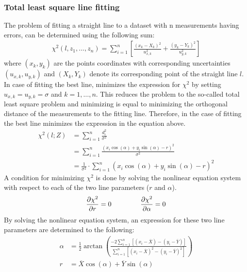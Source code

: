 \documentclass[../Head/Main.tex]{subfiles}
\begin{document}
\subsubsection{Total least square line fitting}
The problem of fitting a straight line to a dataset with n measurements having errors, can be determined using the following sum:
\begin{align}
    \chi^2\left(l, z_1, ..., z_n\right) = \sum_{i = 1}^{n} \left[\frac{\left(x_k - X_k\right)^2}{u_{x, k}^{2}} + \frac{\left(y_k - Y_k\right)^2}{u_{y, k}^{2}}\right]
\end{align}
where $\left(x_k,y_k\right)$ are the points coordinates with corresponding uncertainties $\left(u_{x, k},u_{y, k}\right)$ and $(X_k,Y_k)$ denote its corresponding point of the straight line $l$. In case of fitting the best line, minimizes the expression for $\chi^2$ by setting $u_{x, k} = u_{y, k} = \sigma$ and $k = 1, …, n$. This reduces the problem to the so-called total least square problem and minimizing is equal to minimizing the orthogonal distance of the measurements to the fitting line. Therefore, in the case of fitting the best line minimizes the expression in the equation above.
\begin{align}
    \chi^2\left(l; Z\right) &= \sum_{i = 1}^{n} \frac{d_i^2}{\sigma^2} \\
    &= \sum_{i = 1}^{n}\frac{\left(x_i\cos(\alpha) + y_i\sin⁡(\alpha)-r\right)^2}{\sigma^2}\\
    &= \frac{1}{\sigma^2}\cdot\sum_{i = 1}^{n}\left(x_i\cos(\alpha) + y_i\sin⁡(\alpha)-r\right)^2
\end{align}
A condition for minimizing $\chi^2$ is done by solving the nonlinear equation system with respect to each of the two line parameters ($r$ and $\alpha$). 
\begin{align}
    \frac{\partial\chi^2}{\partial r} = 0 \hspace{1.5cm} \frac{\partial\chi^2}{\partial\alpha} = 0
\end{align}
By solving the nonlinear equation system, an expression for these two line parameters are determined to the following:
\begin{align}
    \alpha &= \frac{1}{2}\arctan\left(\frac{-2\sum_{i=1}^{n}\left[\left(x_i-\overline{X}\right) - \left(y_i-\overline{Y}\right)\right]}{\sum_{i = 1}^{n}\left[\left(x_i-\overline{X}\right)^2 - \left(y_i-\overline{Y}\right)^2\right]}\right) \\
    r &= \overline{X}\cos(\alpha)+\overline{Y}\sin(\alpha)
\end{align}
\end{document}
